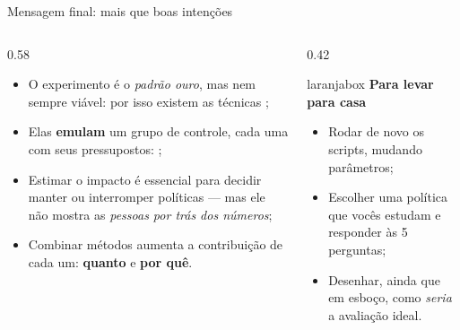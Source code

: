 \begin{frame}{Mensagem final: mais que boas intenções}
  \begin{columns}[T]
    \begin{column}{0.58\textwidth}
      \begin{itemize}
        \item O experimento é o \emph{padrão ouro}, mas nem sempre viável: por isso existem as técnicas ;
        \item Elas \textbf{emulam} um grupo de controle, cada uma com seus pressupostos: ;
        \item Estimar o impacto  é essencial para decidir manter ou interromper políticas --- mas ele não mostra as \emph{pessoas por trás dos números};
        \item Combinar métodos aumenta a contribuição de cada um: \textbf{quanto} e \textbf{por quê}.
      \end{itemize}
    \end{column}
    \begin{column}{0.42\textwidth}
      \begin{beamercolorbox}[wd=\textwidth,rounded=true,sep=0.35cm]{laranjabox}
        \small\textbf{Para levar para casa}
        \begin{itemize}
          \item Rodar de novo os scripts, mudando parâmetros;
          \item Escolher uma política que vocês estudam e responder às 5 perguntas;
          \item Desenhar, ainda que em esboço, como \emph{seria} a avaliação ideal.
        \end{itemize}
      \end{beamercolorbox}
    \end{column}
  \end{columns}
\end{frame}

